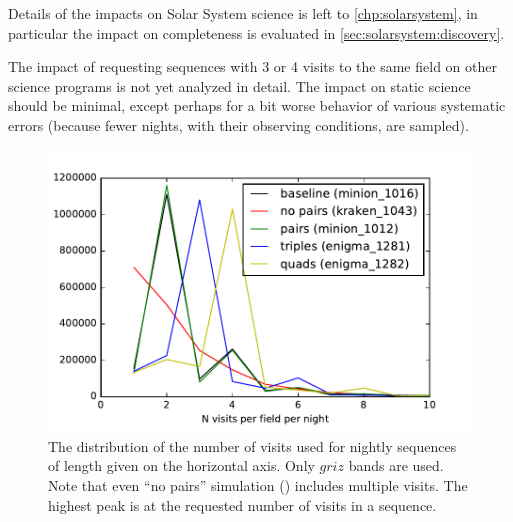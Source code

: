 Details of the impacts on Solar System science is
left to \autoref{chp:solarsystem}, in particular the impact on
completeness is evaluated in \autoref{sec:solarsystem:discovery}.

The impact of requesting sequences with 3 or 4 visits to the same
field on other science programs is not yet analyzed in detail.  The
impact on static science should be minimal, except perhaps for a bit
worse behavior of various systematic errors (because fewer nights,
with their observing conditions, are sampled).

\begin{figure}[t!]
\vskip -0.03in
\includegraphics[angle=0,width=0.99\hsize,clip]{figs/ptq/NvisitStats.pdf}
\vskip -0.2in
\caption{The distribution of the number of visits used for nightly sequences of
length given on the horizontal axis. Only $griz$ bands are used. Note that even
``no pairs'' simulation ()
includes multiple visits. The highest peak is at the
requested number of visits in a sequence.}
\label{fig:NvisitStats}
\end{figure}

